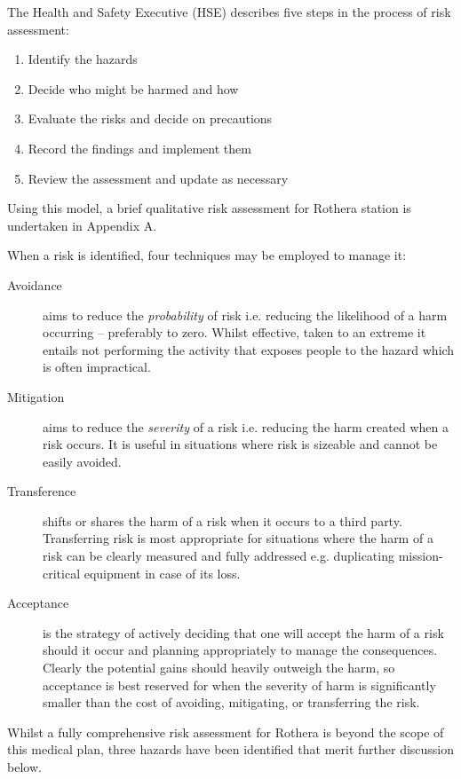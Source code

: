 \documentclass[12pt,a4paper]{article}
\begin{document}
The Health and Safety Executive (HSE) describes five steps\cite{HSE:2012tp} in the process of risk assessment:

\begin{enumerate}
    \item Identify the hazards
    \item Decide who might be harmed and how
    \item Evaluate the risks and decide on precautions
    \item Record the findings and implement them
    \item Review the assessment and update as necessary
\end{enumerate}

Using this model, a brief qualitative risk assessment for Rothera station is undertaken in Appendix A.

When a risk is identified, four techniques may be employed to manage it:

\begin{description}
    \item[Avoidance] aims to reduce the \emph{probability} of risk i.e. reducing the likelihood of a harm occurring -- preferably to zero. Whilst effective, taken to an extreme it entails not performing the activity that exposes people to the hazard which is often impractical.
    \item[Mitigation] aims to reduce the \emph{severity} of a risk i.e. reducing the harm created when a risk occurs. It is useful in situations where risk is sizeable and cannot be easily avoided.
    \item[Transference] shifts or shares the harm of a risk when it occurs to a third party. Transferring risk is most appropriate for situations where the harm of a risk can be clearly measured and fully addressed e.g. duplicating mission-critical equipment in case of its loss.
    \item[Acceptance] is the strategy of actively deciding that one will accept the harm of a risk should it occur and planning appropriately to manage the consequences. Clearly the potential gains should heavily outweigh the harm, so acceptance is best reserved for when the severity of harm is significantly smaller than the cost of avoiding, mitigating, or transferring the risk.
\end{description}

Whilst a fully comprehensive risk assessment for Rothera is beyond the scope of this medical plan, three hazards have been identified that merit further discussion below.
\end{document}
